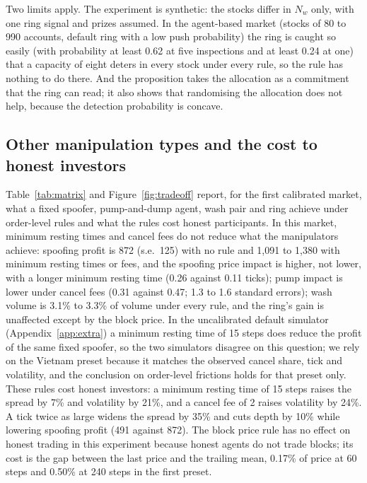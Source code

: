 Two limits apply. The experiment is synthetic: the stocks differ in $N_w$ only, with one ring signal and prizes assumed. In the agent-based market (stocks of 80 to 990 accounts, default ring with a low push probability) the ring is caught so easily (with probability at least 0.62 at five inspections and at least 0.24 at one) that a capacity of eight deters in every stock under every rule, so the rule has nothing to do there. And the proposition takes the allocation as a commitment that the ring can read; it also shows that randomising the allocation does not help, because the detection probability is concave.

\subsection{Other manipulation types and the cost to honest investors}

Table~\ref{tab:matrix} and Figure~\ref{fig:tradeoff} report, for the first calibrated market, what a fixed spoofer, pump-and-dump agent, wash pair and ring achieve under order-level rules and what the rules cost honest participants. In this market, minimum resting times and cancel fees do not reduce what the manipulators achieve: spoofing profit is 872 (s.e.\ 125) with no rule and 1,091 to 1,380 with minimum resting times or fees, and the spoofing price impact is higher, not lower, with a longer minimum resting time (0.26 against 0.11 ticks); pump impact is lower under cancel fees (0.31 against 0.47; 1.3 to 1.6 standard errors); wash volume is 3.1\% to 3.3\% of volume under every rule, and the ring's gain is unaffected except by the block price. In the uncalibrated default simulator (Appendix~\ref{app:extra}) a minimum resting time of 15 steps does reduce the profit of the same fixed spoofer, so the two simulators disagree on this question; we rely on the Vietnam preset because it matches the observed cancel share, tick and volatility, and the conclusion on order-level frictions holds for that preset only. These rules cost honest investors: a minimum resting time of 15 steps raises the spread by 7\% and volatility by 21\%, and a cancel fee of 2 raises volatility by 24\%. A tick twice as large widens the spread by 35\% and cuts depth by 10\% while lowering spoofing profit (491 against 872). The block price rule has no effect on honest trading in this experiment because honest agents do not trade blocks; its cost is the gap between the last price and the trailing mean, 0.17\% of price at 60 steps and 0.50\% at 240 steps in the first preset.

